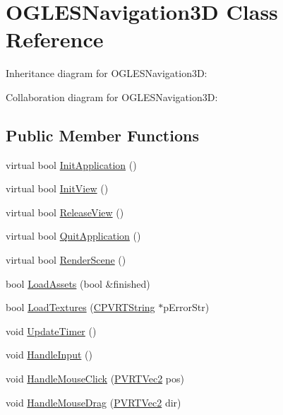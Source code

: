 \hypertarget{class_o_g_l_e_s_navigation3_d}{\section{O\+G\+L\+E\+S\+Navigation3\+D Class Reference}
\label{class_o_g_l_e_s_navigation3_d}
}


Inheritance diagram for O\+G\+L\+E\+S\+Navigation3\+D\+:


Collaboration diagram for O\+G\+L\+E\+S\+Navigation3\+D\+:
\subsection*{Public Member Functions}
\begin{DoxyCompactItemize}
\item 
virtual bool \hyperlink{class_o_g_l_e_s_navigation3_d_a7021194693eee5f436a0a7b00b0cf010}{Init\+Application} ()
\item 
virtual bool \hyperlink{class_o_g_l_e_s_navigation3_d_a95be335cfd305628fda34925feeab500}{Init\+View} ()
\item 
virtual bool \hyperlink{class_o_g_l_e_s_navigation3_d_ab967f1278aac79e7932bfb46455621a9}{Release\+View} ()
\item 
virtual bool \hyperlink{class_o_g_l_e_s_navigation3_d_a5d3fc553562272ab97a0df201d39198a}{Quit\+Application} ()
\item 
virtual bool \hyperlink{class_o_g_l_e_s_navigation3_d_a11efe99292758062efe901fb67d54f02}{Render\+Scene} ()
\item 
bool \hyperlink{class_o_g_l_e_s_navigation3_d_a074cf37f2ce799f5110126e43b7f81ea}{Load\+Assets} (bool \&finished)
\item 
bool \hyperlink{class_o_g_l_e_s_navigation3_d_aa3d24ca68c6d99b00b867c59bad52587}{Load\+Textures} (\hyperlink{class_c_p_v_r_t_string}{C\+P\+V\+R\+T\+String} $\ast$p\+Error\+Str)
\item 
void \hyperlink{class_o_g_l_e_s_navigation3_d_ae4146abdfd3e8d11d9c8adde9785de30}{Update\+Timer} ()
\item 
void \hyperlink{class_o_g_l_e_s_navigation3_d_acf6ceaae2d7321143a5ffb2816e8e238}{Handle\+Input} ()
\item 
void \hyperlink{class_o_g_l_e_s_navigation3_d_a23b052f7c3232ad7bfe47edb7182d58c}{Handle\+Mouse\+Click} (\hyperlink{struct_p_v_r_t_vec2}{P\+V\+R\+T\+Vec2} pos)
\item 
void \hyperlink{class_o_g_l_e_s_navigation3_d_a03c65012cfbf20297bb24d0f9c4df412}{Handle\+Mouse\+Drag} (\hyperlink{struct_p_v_r_t_vec2}{P\+V\+R\+T\+Vec2} dir)

\end{DoxyCompactItemize}
